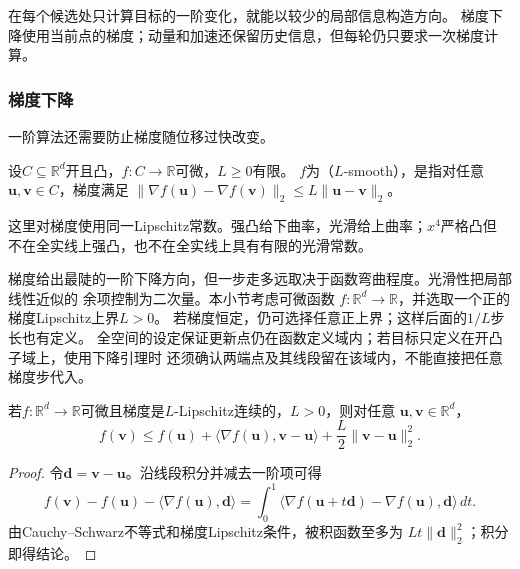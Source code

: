 在每个候选处只计算目标的一阶变化，就能以较少的局部信息构造方向。
梯度下降使用当前点的梯度；动量和加速还保留历史信息，但每轮仍只要求一次梯度计算。

\subsubsection{梯度下降}
\label{sec:opt-gradient-descent}

一阶算法还需要防止梯度随位移过快改变。
\begin{definition}[欧氏梯度光滑性]
\label{def:opt-smoothness}
设$C\subseteq\mathbb R^d$开且凸，$f:C\to\mathbb R$可微，$L\geq0$有限。
$f$为（$L$-smooth），是指对任意$\bm u,\bm v\in C$，梯度满足
$\lVert\nabla f(\bm{u})-\nabla f(\bm{v})\rVert_2
\leq L\lVert\bm{u}-\bm{v}\rVert_2$。
\end{definition}
这里对梯度使用同一Lipschitz常数。强凸给下曲率，光滑给上曲率；$x^4$严格凸但
不在全实线上强凸，也不在全实线上具有有限的光滑常数。

梯度给出最陡的一阶下降方向，但一步走多远取决于函数弯曲程度。光滑性把局部线性近似的
余项控制为二次量。本小节考虑可微函数
$f:\mathbb R^d\to\mathbb R$，并选取一个正的梯度Lipschitz上界$L>0$。
若梯度恒定，仍可选择任意正上界；这样后面的$1/L$步长也有定义。
全空间的设定保证更新点仍在函数定义域内；若目标只定义在开凸子域上，使用下降引理时
还须确认两端点及其线段留在该域内，不能直接把任意梯度步代入。

\begin{lemma}[下降引理]
\label{lem:opt-descent}
若$f:\mathbb R^d\to\mathbb R$可微且梯度是$L$-Lipschitz连续的，$L>0$，则对任意
$\bm u,\bm v\in\mathbb R^d$，
\begin{equation}
  f(\bm{v})\leq f(\bm{u})
  +\langle\nabla f(\bm{u}),\bm{v}-\bm{u}\rangle
  +\frac{L}{2}\lVert\bm{v}-\bm{u}\rVert_2^2.
  \label{eq:opt-descent-lemma}
\end{equation}
\end{lemma}

\begin{proof}
令$\bm{d}=\bm{v}-\bm{u}$。沿线段积分并减去一阶项可得
\[
  f(\bm{v})-f(\bm{u})-\langle\nabla f(\bm{u}),\bm{d}\rangle
  =
  \int_0^1
  \langle\nabla f(\bm{u}+t\bm{d})-\nabla f(\bm{u}),\bm{d}\rangle\,dt.
\]
由Cauchy--Schwarz不等式和梯度Lipschitz条件，被积函数至多为
$Lt\lVert\bm{d}\rVert_2^2$；积分即得结论。
\end{proof}

